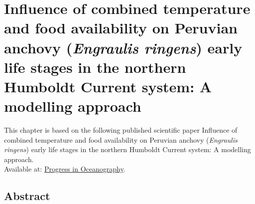 \chapter{Influence of combined temperature and food availability on Peruvian anchovy (\textit{Engraulis ringens}) early life stages in the northern Humboldt Current system: A modelling approach}\label{Chap3}

This chapter is based on the following published scientific paper \citep{FlorLett2023} Influence of combined temperature and food availability on Peruvian anchovy (\textit{Engraulis ringens}) early life stages in the northern Humboldt Current system: A modelling approach.\\

Available at: \href{https://www.sciencedirect.com/science/article/abs/pii/S0079661123000770}{Progress in Oceanography}.

\section*{Abstract}

